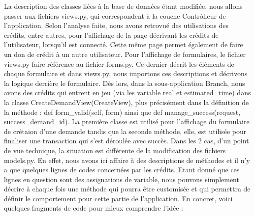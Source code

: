 La description des classes liées à la base de données étant modifiée,  nous allons passer aux fichiers views.py,  qui correspondent à la couche Contrôlleur de l'application.  Selon l'analyse faite,  nous avons retrovué des utilisations des crédits,  entre autres,  pour l'affichage de la page décrivant les crédits de l'utilisateur,  lorsqu'il est connecté.  Cette même page permet également de faire un don de crédit à un autre utilisateur.  Pour l'affichage de formulaires,  le fichier views.py faire référence au fichier forms.py.  Ce dernier décrit les éléments de chaque formulaire et dans views.py,  nous importons ces descriptions et décrivons la logique derrière le formulaire.  Dès lors,  dans la sous-application Branch,  nous avons des crédits qui entrent en jeu (via les variable real et estimated\_time) dans la classe CreateDemandView(CreateView),  plus précisément dans la définition de la méthode : def form\_valid(self, form) ainsi que def manage\_success(request, success\_demand\_id).  La première classe est utilisé pour l'affichage du formulaire de crétaion d'une demande tandis que la seconde méthode,  elle,  est utilisée pour finaliser une transaction qui s'est déroulée avec succès.  Dans les 2 cas,  d'un point de vue technique,  la situation est différente de la modification des fichiers models.py.  En effet,  nous avons ici affaire à des descriptions de méthodes et il n'y a que quelques lignes de codes concernées par les crédits.  Etant donné que ces lignes en question sont des assignations de variable,  nous pouvons simplement décrire à chaque fois une méthode qui pourra être customisée et qui permettra de définir le comportement pour cette partie de l'application.  En concret,  voici quelques fragments de code pour mieux comprendre l'idée : 

